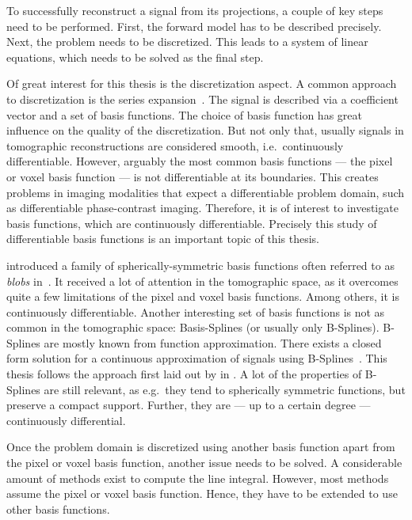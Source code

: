 To successfully reconstruct a signal from its projections, a couple of key steps need to be
performed. First, the forward model has to be described precisely. Next, the problem needs to be
discretized. This leads to a system of linear equations, which needs to be solved as the final step.

Of great interest for this thesis is the discretization aspect. A common approach to discretization
is the series expansion~\cite{herman_basis_2015}. The signal is described via a coefficient vector
and a set of basis functions. The choice of basis function has great influence on the quality of the
discretization. But not only that, usually signals in tomographic reconstructions are considered
smooth, i.e.\ continuously differentiable. However, arguably the most common basis functions --- the
pixel or voxel basis function --- is not differentiable at its boundaries. This creates problems in
imaging modalities that expect a differentiable problem domain, such as differentiable
phase-contrast imaging. Therefore, it is of interest to investigate basis functions, which are
continuously differentiable. Precisely this study of differentiable basis functions is an important
topic of this thesis.

\citeauthor*{lewitt_multidimensional_1990} introduced a family of spherically-symmetric basis
functions often referred to as \textit{blobs} in~\cite{lewitt_multidimensional_1990}. It received a
lot of attention in the tomographic space, as it overcomes quite a few limitations of the pixel and
voxel basis functions. Among others, it is continuously differentiable. Another interesting set of
basis functions is not as common in the tomographic space: Basis-Splines (or usually only
B-Splines). B-Splines are mostly known from function approximation. There exists a closed form
solution for a continuous approximation of signals using B-Splines~\cite{unser_fast_1991}. This
thesis follows the approach first laid out by \citeauthor*{momey_new_2011} in \cite{momey_new_2011}.
A lot of the properties of B-Splines are still relevant, as e.g.\ they tend to spherically symmetric
functions, but preserve a compact support. Further, they are --- up to a certain degree ---
continuously differential.

Once the problem domain is discretized using another basis function apart from the pixel or voxel
basis function, another issue needs to be solved. A considerable amount of methods exist to compute
the line integral. However, most methods assume the pixel or voxel basis function. Hence, they have
to be extended to use other basis functions.

